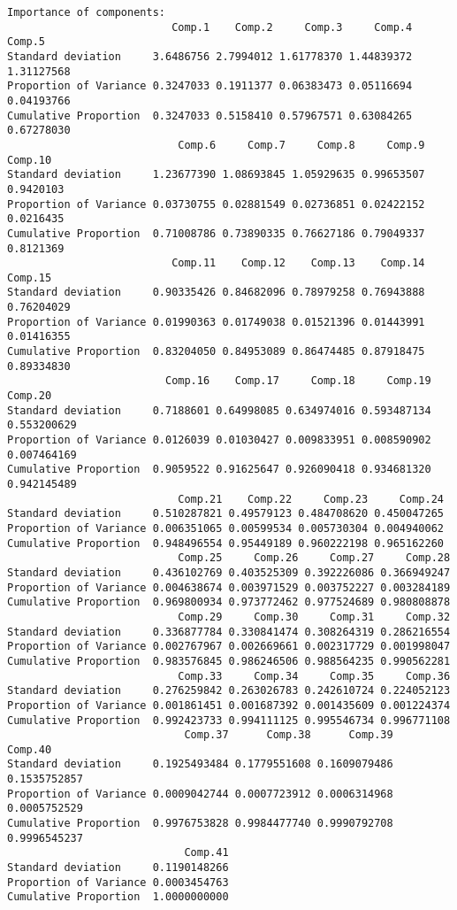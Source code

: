 \documentclass[12pt,twoside]{deuthesis}
\begin{document}
\begin{verbatim}
Importance of components:
                          Comp.1    Comp.2     Comp.3     Comp.4     Comp.5
Standard deviation     3.6486756 2.7994012 1.61778370 1.44839372 1.31127568
Proportion of Variance 0.3247033 0.1911377 0.06383473 0.05116694 0.04193766
Cumulative Proportion  0.3247033 0.5158410 0.57967571 0.63084265 0.67278030
                           Comp.6     Comp.7     Comp.8     Comp.9   Comp.10
Standard deviation     1.23677390 1.08693845 1.05929635 0.99653507 0.9420103
Proportion of Variance 0.03730755 0.02881549 0.02736851 0.02422152 0.0216435
Cumulative Proportion  0.71008786 0.73890335 0.76627186 0.79049337 0.8121369
                          Comp.11    Comp.12    Comp.13    Comp.14    Comp.15
Standard deviation     0.90335426 0.84682096 0.78979258 0.76943888 0.76204029
Proportion of Variance 0.01990363 0.01749038 0.01521396 0.01443991 0.01416355
Cumulative Proportion  0.83204050 0.84953089 0.86474485 0.87918475 0.89334830
                         Comp.16    Comp.17     Comp.18     Comp.19     Comp.20
Standard deviation     0.7188601 0.64998085 0.634974016 0.593487134 0.553200629
Proportion of Variance 0.0126039 0.01030427 0.009833951 0.008590902 0.007464169
Cumulative Proportion  0.9059522 0.91625647 0.926090418 0.934681320 0.942145489
                           Comp.21    Comp.22     Comp.23     Comp.24
Standard deviation     0.510287821 0.49579123 0.484708620 0.450047265
Proportion of Variance 0.006351065 0.00599534 0.005730304 0.004940062
Cumulative Proportion  0.948496554 0.95449189 0.960222198 0.965162260
                           Comp.25     Comp.26     Comp.27     Comp.28
Standard deviation     0.436102769 0.403525309 0.392226086 0.366949247
Proportion of Variance 0.004638674 0.003971529 0.003752227 0.003284189
Cumulative Proportion  0.969800934 0.973772462 0.977524689 0.980808878
                           Comp.29     Comp.30     Comp.31     Comp.32
Standard deviation     0.336877784 0.330841474 0.308264319 0.286216554
Proportion of Variance 0.002767967 0.002669661 0.002317729 0.001998047
Cumulative Proportion  0.983576845 0.986246506 0.988564235 0.990562281
                           Comp.33     Comp.34     Comp.35     Comp.36
Standard deviation     0.276259842 0.263026783 0.242610724 0.224052123
Proportion of Variance 0.001861451 0.001687392 0.001435609 0.001224374
Cumulative Proportion  0.992423733 0.994111125 0.995546734 0.996771108
                            Comp.37      Comp.38      Comp.39      Comp.40
Standard deviation     0.1925493484 0.1779551608 0.1609079486 0.1535752857
Proportion of Variance 0.0009042744 0.0007723912 0.0006314968 0.0005752529
Cumulative Proportion  0.9976753828 0.9984477740 0.9990792708 0.9996545237
                            Comp.41
Standard deviation     0.1190148266
Proportion of Variance 0.0003454763
Cumulative Proportion  1.0000000000
\end{verbatim}
\setlength{\parindent}{0in}
\end{document}
